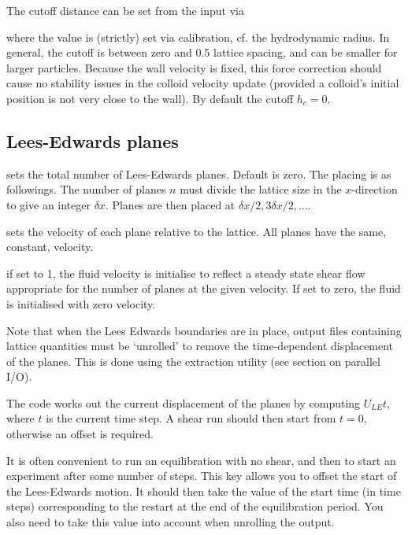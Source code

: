 The cutoff distance can be set from the input via


where the value is (strictly) set via calibration, cf. the hydrodynamic
radius. In general, the cutoff is between zero and 0.5 lattice spacing,
and can be smaller for larger particles. Because the wall velocity is
fixed, this force correction should cause no stability issues in the
colloid velocity update (provided a colloid's initial position is not
very close to the wall). By default the cutoff $h_c = 0$.

\subsection{Lees-Edwards planes}


sets the total number of Lees-Edwards planes. Default is zero.
The placing is as followings. The number of planes $n$ must
divide the lattice size in the $x$-direction to give an integer
$\delta x$. Planes are then placed at $\delta x / 2, 3\delta x/2, \ldots$.


sets the velocity of each plane relative to the lattice. All planes
have the same, constant, velocity.


if set to 1, the fluid velocity is initialise to reflect a steady
state shear flow appropriate for the number of planes at the
given velocity. If set to zero, the fluid is initialised with
zero velocity.

Note that when the Lees Edwards boundaries are in place, output
files containing lattice quantities must be `unrolled' to remove
the time-dependent displacement of the planes. This is done using
the extraction utility (see section on parallel I/O).

The code works out the
current displacement of the planes by computing $U_{LE} t$, where
$t$ is the current time step. A shear run should then start from
$t = 0$, otherwise an offset is required.


It is often convenient to run an equilibration with no shear, and
then to start an experiment after some number of steps. This
key allows you to offset the start of the Lees-Edwards motion.
It should then take the value of the start time (in time steps)
corresponding to the restart at the end of the equilibration
period. You also need to take this value into account when unrolling
the output.

